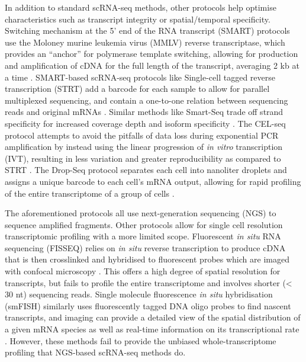 \documentclass[withindex,glossary]{cam-thesis}
\begin{document}
In addition to standard scRNA-seq methods, other protocols help optimise
characteristics such as transcript integrity or spatial/temporal
specificity. Switching mechanism at the 5' end of the RNA transcript
(\gls{SMART}) protocols use the Moloney murine leukemia virus (\gls{MMLV}) reverse
transcriptase, which provides an ``anchor'' for polymerase template
switching, allowing for production and amplification of cDNA for the
full length of the transcript, averaging 2 kb at a time . SMART-based scRNA-seq protocols like Single-cell tagged reverse
transcription (\gls{STRT}) add a barcode for each sample to allow for parallel
multiplexed sequencing, and contain a one-to-one relation between
sequencing reads and original mRNAs . Similar methods like Smart-Seq trade off strand specificity for
increased coverage depth and isoform specificity . The CEL-seq protocol attempts to avoid the
pitfalls of data loss during exponential PCR amplification by instead
using the linear progression of \emph{in vitro} transcription (\gls{IVT}),
resulting in less variation and greater reproducibility as compared to
STRT . The Drop-Seq protocol separates each
cell into nanoliter droplets and assigns a unique barcode to each cell's
mRNA output, allowing for rapid profiling of the entire transcriptome of
a group of cells .

The aforementioned protocols all use next-generation sequencing (\gls{NGS}) to
sequence amplified fragments. Other protocols allow for single cell
resolution transcriptomic profiling with a more limited scope.
Fluorescent \emph{in situ} RNA sequencing (\gls{FISSEQ}) relies on \emph{in
situ} reverse transcription to produce cDNA that is then crosslinked and
hybridised to fluorescent probes which are imaged with confocal
microscopy . This offers a high degree of
spatial resolution for transcripts, but fails to profile the entire
transcriptome and involves shorter (\textless{} 30 nt) sequencing reads.
Single molecule fluorescence \emph{in situ} hybridisation (\gls{smFISH})
similarly uses fluorescently tagged DNA oligo probes to find nascent
transcripts, and imaging can provide a detailed view of the spatial
distribution of a given mRNA species as well as real-time information on
its transcriptional rate . However, these methods
fail to provide the unbiased whole-transcriptome profiling that
NGS-based scRNA-seq methods do.
\end{document}
